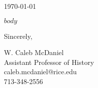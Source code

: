 \documentclass[12pt]{article}
\begin{document}
\thispagestyle{empty}
\vspace*{0.5in}

\today
\begin{flushleft}
$body$
\end{flushleft}

Sincerely,
\par%
W. Caleb McDaniel\\Assistant Professor of History\\caleb.mcdaniel@rice.edu\\713-348-2556
\end{document}
